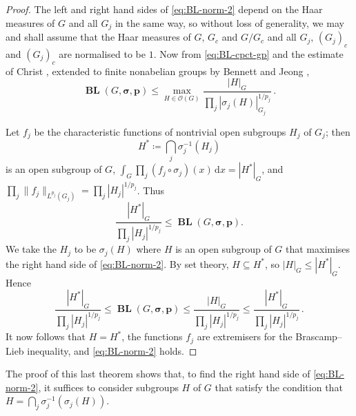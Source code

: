 \documentclass[12pt,twoside,a4paper]{amsart}
\theoremstyle{definition}
\theoremstyle{remark}
\numberwithin{equation}{section}
\newcommand{\wrt}[1]{\,\mathrm{d} #1}
\newcommand{\BL}{\operatorname{\mathbf{BL}}}
\newcommand{\bss}{\boldsymbol{\sigma}}
\newcommand{\bsp}{\boldsymbol{p}}
\newcommand{\labs}{\left\vert}
\newcommand{\rabs}{\right\vert}
\begin{document}
\begin{proof}
The left and right hand sides of \eqref{eq:BL-norm-2} depend on the Haar measures of $G$ and all $G_j$ in the same way, so without loss of generality, we may and shall assume that the Haar measures of $G$, $G_c$ and $G/G_c$ and all $G_j$, $(G_j)_c$ and $(G_j)_c$ are normalised to be $1$.
Now from \eqref{eq:BL-cpct-gp} and the estimate of Christ \cite{Chr13}, extended to finite nonabelian groups by Bennett and Jeong \cite{BJ22},
\[
\BL(G, \bss, \bsp) 
\leq \max_{H \in \mathcal{O}(G)} \frac{ |H|_G}  { \prod_j | \sigma_j(H) |_{G_j}^{1/p_j}} \,.
\]

Let $f_j$ be the characteristic functions of  nontrivial open subgroups $H_j$ of $G_j$; then 
\[
H^* \coloneqq  \bigcap_j \sigma_j^{-1}(H_j) 
\]
is an open subgroup of $G$, $\int_G \prod_j (f_j\circ\sigma_j)(x) \wrt x  = \labs  H^* \rabs_{G}$,
and $\prod_j \| f_j \|_{L^{p_j}(G_j)}  = \prod_j |H_j |^{1/p_j} $.
Thus
\[
 \frac{ \labs  H^* \rabs_{G} }{\prod_j |H_j |^{1/p_j} }  \leq \BL(G, \bss ,\bsp).
\]
We take the $H_j$ to be $\sigma_j(H)$ where $H$ is an open subgroup of $G$ that maximises the right hand side of \eqref{eq:BL-norm-2}. 
By set theory, $H \subseteq H^*$, so $|H|_G \leq |H^*|_G$. 
Hence
\[
 \frac{ \labs  H^* \rabs_{G} }{\prod_j |H_j |^{1/p_j} } 
\leq \BL(G, \bss ,\bsp)
\leq  \frac{ \labs  H \rabs_{G} }{\prod_j |H_j |^{1/p_j} }  
\leq  \frac{ \labs  H^* \rabs_{G} }{\prod_j |H_j |^{1/p_j} } \,.
\] 
It now follows that $H = H^*$, the functions $f_j$ are extremisers for the Brascamp--Lieb inequality, and \eqref{eq:BL-norm-2} holds.
\end{proof}

The proof of this last theorem shows that, to find the right hand side of \eqref{eq:BL-norm-2}, it suffices to consider subgroups $H$ of $G$ that satisfy the condition that $H = \bigcap_j \sigma_j^{-1}(\sigma_j(H))$.
\end{document}
